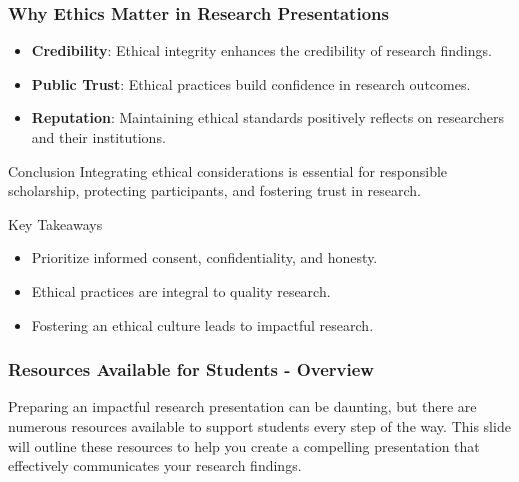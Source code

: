 \documentclass[aspectratio=169]{beamer}
\begin{document}
\begin{frame}[fragile]
    \frametitle{Why Ethics Matter in Research Presentations}
    \begin{itemize}
        \item \textbf{Credibility}: Ethical integrity enhances the credibility of research findings.
        \item \textbf{Public Trust}: Ethical practices build confidence in research outcomes.
        \item \textbf{Reputation}: Maintaining ethical standards positively reflects on researchers and their institutions.
    \end{itemize}
    
    \begin{block}{Conclusion}
        Integrating ethical considerations is essential for responsible scholarship, protecting participants, and fostering trust in research.
    \end{block}

    \begin{block}{Key Takeaways}
        \begin{itemize}
            \item Prioritize informed consent, confidentiality, and honesty.
            \item Ethical practices are integral to quality research.
            \item Fostering an ethical culture leads to impactful research.
        \end{itemize}
    \end{block}
\end{frame}

\begin{frame}[fragile]
    \frametitle{Resources Available for Students - Overview}
    Preparing an impactful research presentation can be daunting, but there are numerous resources available to support students every step of the way. This slide will outline these resources to help you create a compelling presentation that effectively communicates your research findings.
\end{frame}
\end{document}
